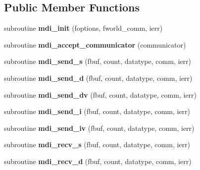 \subsection*{Public Member Functions}
\begin{DoxyCompactItemize}
\item 
\hypertarget{classmdi_a35894bce734c441b9937f571436443b9}{subroutine {\bfseries mdi\-\_\-init} (foptions, fworld\-\_\-comm, ierr)}\label{classmdi_a35894bce734c441b9937f571436443b9}

\item 
\hypertarget{classmdi_a614089c34c2781079993f86374ee6d93}{subroutine {\bfseries mdi\-\_\-accept\-\_\-communicator} (communicator)}\label{classmdi_a614089c34c2781079993f86374ee6d93}

\item 
\hypertarget{classmdi_aca4f914ed81b61608b82072c034e2990}{subroutine {\bfseries mdi\-\_\-send\-\_\-s} (fbuf, count, datatype, comm, ierr)}\label{classmdi_aca4f914ed81b61608b82072c034e2990}

\item 
\hypertarget{classmdi_aec59c1cdcf1fa6438a2d1d7b87a39b25}{subroutine {\bfseries mdi\-\_\-send\-\_\-d} (fbuf, count, datatype, comm, ierr)}\label{classmdi_aec59c1cdcf1fa6438a2d1d7b87a39b25}

\item 
\hypertarget{classmdi_a53817bdecd52bd0ac15e492050ce7f18}{subroutine {\bfseries mdi\-\_\-send\-\_\-dv} (fbuf, count, datatype, comm, ierr)}\label{classmdi_a53817bdecd52bd0ac15e492050ce7f18}

\item 
\hypertarget{classmdi_ac98e90a334cfdefcd9ef67ec9138b29d}{subroutine {\bfseries mdi\-\_\-send\-\_\-i} (fbuf, count, datatype, comm, ierr)}\label{classmdi_ac98e90a334cfdefcd9ef67ec9138b29d}

\item 
\hypertarget{classmdi_a319b5646a6013e724ec626e0c3a40d4b}{subroutine {\bfseries mdi\-\_\-send\-\_\-iv} (fbuf, count, datatype, comm, ierr)}\label{classmdi_a319b5646a6013e724ec626e0c3a40d4b}

\item 
\hypertarget{classmdi_a9cb1ca30b5286e39ea33f0ce94c41134}{subroutine {\bfseries mdi\-\_\-recv\-\_\-s} (fbuf, count, datatype, comm, ierr)}\label{classmdi_a9cb1ca30b5286e39ea33f0ce94c41134}

\item 
\hypertarget{classmdi_a1f60540c592948d6170a46433402dbdc}{subroutine {\bfseries mdi\-\_\-recv\-\_\-d} (fbuf, count, datatype, comm, ierr)}\label{classmdi_a1f60540c592948d6170a46433402dbdc}


\end{DoxyCompactItemize}
